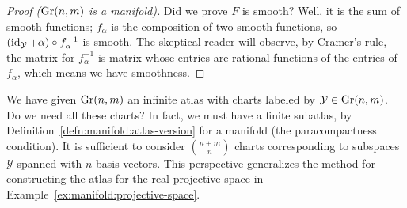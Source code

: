 \begin{proof}[Proof ($\operatorname{Gr}(n,m)$ is a manifold)]
Did we prove $F$ is smooth? Well, it is the sum of smooth functions;
$f_{\alpha}$ is the composition of two smooth functions, so
$(\operatorname{id}_{\mathcal{Y}} + \alpha)\circ f_{\alpha}^{-1}$ is smooth. The
skeptical reader will observe, by Cramer's rule, the matrix for
$f_{\alpha}^{-1}$ is matrix whose entries are rational functions of the
entries of $f_{\alpha}$, which means we have smoothness.
\end{proof}

\begin{remark}
We have given $\operatorname{Gr}(n,m)$ an infinite atlas with charts labeled by
$\mathcal{Y}\in\operatorname{Gr}(n,m)$. Do we need all these charts? In fact,
we must have a finite subatlas, by
Definition~\ref{defn:manifold:atlas-version} for a manifold (the
paracompactness condition). It is sufficient to consider $\binom{n+m}{n}$ charts
corresponding to subspaces $\mathcal{Y}$ spanned with $n$ basis vectors.
This perspective generalizes the method for constructing the atlas for
the real projective space in Example~\ref{ex:manifold:projective-space}.
\end{remark}

\endinput
